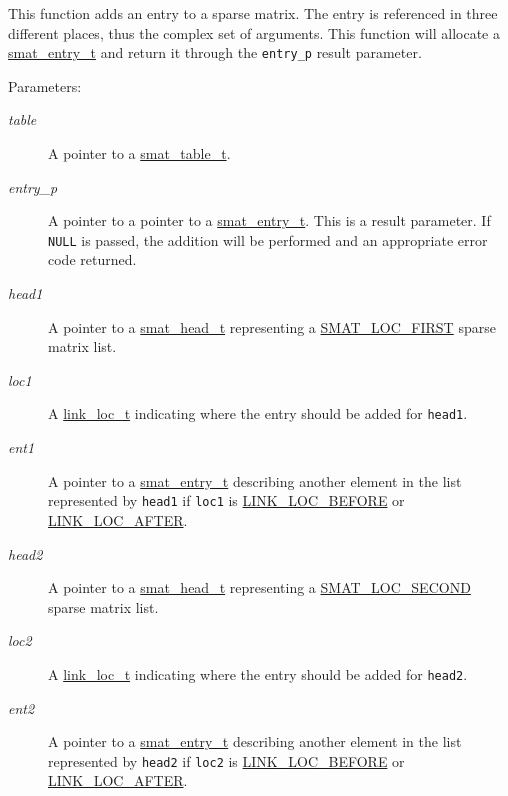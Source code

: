 This function adds an entry to a sparse matrix. The entry is referenced in three different places, thus the complex set of arguments. This function will allocate a \hyperlink{group__dbprim__smat_a2}{smat\_\-entry\_\-t} and return it through the {\tt entry\_\-p} result parameter.\begin{Desc}
\item[Parameters: ]\par
\begin{description}
\item[{\em 
table}]A pointer to a \hyperlink{group__dbprim__smat_a0}{smat\_\-table\_\-t}. \item[{\em 
entry\_\-p}]A pointer to a pointer to a \hyperlink{group__dbprim__smat_a2}{smat\_\-entry\_\-t}. This is a result parameter. If {\tt NULL} is passed, the addition will be performed and an appropriate error code returned. \item[{\em 
head1}]A pointer to a \hyperlink{group__dbprim__smat_a1}{smat\_\-head\_\-t} representing a \hyperlink{group__dbprim__smat_a47a135}{SMAT\_\-LOC\_\-FIRST} sparse matrix list. \item[{\em 
loc1}]A \hyperlink{group__dbprim__link_a4}{link\_\-loc\_\-t} indicating where the entry should be added for {\tt head1}. \item[{\em 
ent1}]A pointer to a \hyperlink{group__dbprim__smat_a2}{smat\_\-entry\_\-t} describing another element in the list represented by {\tt head1} if {\tt loc1} is \hyperlink{group__dbprim__link_a26a133}{LINK\_\-LOC\_\-BEFORE} or \hyperlink{group__dbprim__link_a26a134}{LINK\_\-LOC\_\-AFTER}. \item[{\em 
head2}]A pointer to a \hyperlink{group__dbprim__smat_a1}{smat\_\-head\_\-t} representing a \hyperlink{group__dbprim__smat_a47a136}{SMAT\_\-LOC\_\-SECOND} sparse matrix list. \item[{\em 
loc2}]A \hyperlink{group__dbprim__link_a4}{link\_\-loc\_\-t} indicating where the entry should be added for {\tt head2}. \item[{\em 
ent2}]A pointer to a \hyperlink{group__dbprim__smat_a2}{smat\_\-entry\_\-t} describing another element in the list represented by {\tt head2} if {\tt loc2} is \hyperlink{group__dbprim__link_a26a133}{LINK\_\-LOC\_\-BEFORE} or \hyperlink{group__dbprim__link_a26a134}{LINK\_\-LOC\_\-AFTER}.\end{description}
\end{Desc}
